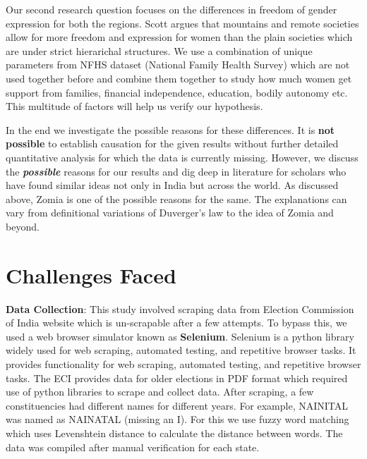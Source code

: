 \begin{sloppypar}
\vspace{0.2cm}

Our second research question focuses on the differences in freedom of gender expression for both the regions. Scott argues that mountains and remote societies allow for more freedom and expression for women than the plain societies which are under strict hierarichal structures. We use a combination of unique parameters from NFHS dataset (National Family Health Survey) which are not used together before and combine them together to study how much women get support from families, financial independence, education, bodily autonomy etc. This multitude of factors will help us verify our hypothesis.

\vspace{0.2cm}

In the end we investigate the possible reasons for these differences. It is \textbf{not possible} to establish causation for the given results without further detailed quantitative analysis for which the data is currently missing. However, we discuss the \textit{\textbf{possible}} reasons for our results and dig deep in literature for scholars who have found similar ideas not only in India but across the world. As discussed above, Zomia is one of the possible reasons for the same. The explanations can vary from definitional variations of Duverger's law to the idea of Zomia and beyond. 

\section{Challenges Faced}

\textbf{Data Collection}: This study involved scraping data from Election Commission of India \citep{ECI_WEBSITE} website which is un-scrapable after a few attempts. To bypass this, we used a web browser simulator known as \textbf{Selenium}. Selenium is a python library widely used for web scraping, automated testing, and repetitive browser tasks. It provides functionality for web scraping, automated testing, and repetitive browser tasks. The ECI provides data for older elections in PDF format which required use of python libraries to scrape and collect data. After scraping, a few constituencies had different names for different years. For example, NAINITAL was named as NAINATAL (missing an I). For this we use fuzzy word matching which uses Levenshtein distance to calculate the distance between words. The data was compiled after manual verification for each state.


\end{sloppypar}
